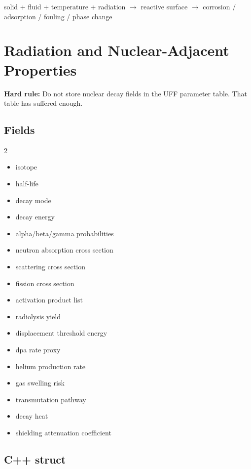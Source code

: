 \documentclass[11pt, a4paper]{article}
\begin{document}
\begin{center}
solid + fluid + temperature + radiation $\rightarrow$ reactive surface $\rightarrow$ corrosion / adsorption / fouling / phase change
\end{center}

\section{Radiation and Nuclear-Adjacent Properties}

\begin{rulebox}
\textbf{Hard rule:} Do not store nuclear decay fields in the UFF parameter table. That table has suffered enough.
\end{rulebox}

\subsection{Fields}

\begin{multicols}{2}
\begin{itemize}[itemsep=1pt, leftmargin=*]
  \item isotope
  \item half-life
  \item decay mode
  \item decay energy
  \item alpha/beta/gamma probabilities
  \item neutron absorption cross section
  \item scattering cross section
  \item fission cross section
  \item activation product list
  \item radiolysis yield
  \item displacement threshold energy
  \item dpa rate proxy
  \item helium production rate
  \item gas swelling risk
  \item transmutation pathway
  \item decay heat
  \item shielding attenuation coefficient
\end{itemize}
\end{multicols}

\subsection{C++ struct}
\end{document}
